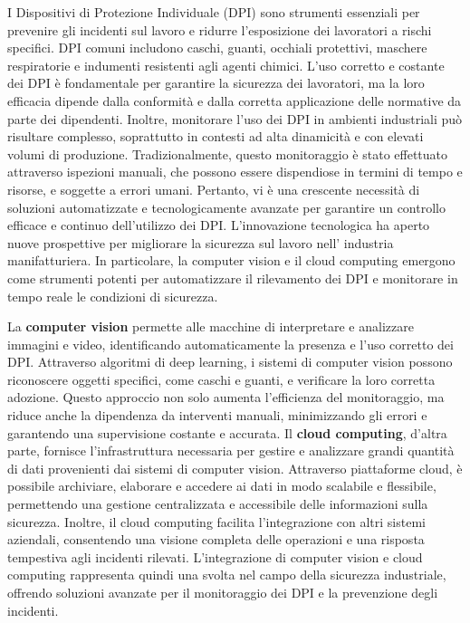 I Dispositivi di Protezione Individuale (DPI) sono strumenti essenziali per prevenire gli incidenti sul lavoro e ridurre l'esposizione dei lavoratori a rischi specifici. DPI comuni includono caschi, guanti, occhiali protettivi, maschere respiratorie e indumenti resistenti agli agenti chimici. L'uso corretto e costante dei DPI è fondamentale per garantire la sicurezza dei lavoratori, ma la loro efficacia dipende dalla conformità e dalla corretta applicazione delle normative da parte dei dipendenti. Inoltre, monitorare l'uso dei DPI in ambienti industriali può risultare complesso, soprattutto in contesti ad alta dinamicità e con elevati volumi di produzione. Tradizionalmente, questo monitoraggio è stato effettuato attraverso ispezioni manuali, che possono essere dispendiose in termini di tempo e risorse, e soggette a errori umani. Pertanto, vi è una crescente necessità di soluzioni automatizzate e tecnologicamente avanzate per garantire un controllo efficace e continuo dell'utilizzo dei DPI. L'innovazione tecnologica ha aperto nuove prospettive per migliorare la sicurezza sul lavoro nell' industria manifatturiera. In particolare, la computer vision e il cloud computing emergono come strumenti potenti per automatizzare il rilevamento dei DPI e monitorare in tempo reale le condizioni di sicurezza.

La {\bfseries computer vision} permette alle macchine di interpretare e analizzare immagini e video, identificando automaticamente la presenza e l'uso corretto dei DPI. Attraverso algoritmi di deep learning, i sistemi di computer vision possono riconoscere oggetti specifici, come caschi e guanti, e verificare la loro corretta adozione. Questo approccio non solo aumenta l'efficienza del monitoraggio, ma riduce anche la dipendenza da interventi manuali, minimizzando gli errori e garantendo una supervisione costante e accurata. Il {\bfseries cloud computing}, d'altra parte, fornisce l'infrastruttura necessaria per gestire e analizzare grandi quantità di dati provenienti dai sistemi di computer vision. Attraverso piattaforme cloud, è possibile archiviare, elaborare e accedere ai dati in modo scalabile e flessibile, permettendo una gestione centralizzata e accessibile delle informazioni sulla sicurezza. Inoltre, il cloud computing facilita l'integrazione con altri sistemi aziendali, consentendo una visione completa delle operazioni e una risposta tempestiva agli incidenti rilevati. L'integrazione di computer vision e cloud computing rappresenta quindi una svolta nel campo della sicurezza industriale, offrendo soluzioni avanzate per il monitoraggio dei DPI e la prevenzione degli incidenti. 

